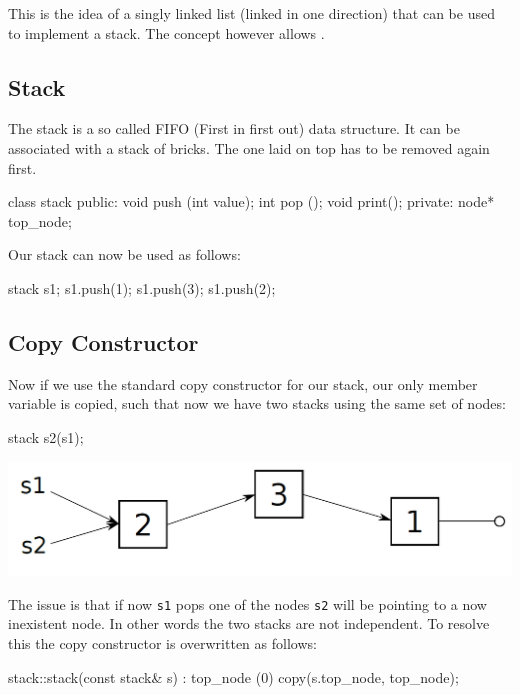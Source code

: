\documentclass[10pt,a4paper]{scrartcl}
\begin{document}
\begin{multicols*}{2}
This is the idea of a singly linked list (linked in one direction) that can be used to implement a stack. The concept however allows .

\subsection{Stack}
\label{sec:Stack}

The stack is a so called FIFO (First in first out) data structure. It can be associated with a stack of bricks. The one laid on top has to be removed again first.

\begin{TPCpp}
class stack {
public:
	void push (int value);
	int pop ();
	void print();
private:
	node* top_node;
}
\end{TPCpp}

Our stack can now be used as follows:

\begin{TPCpp}
stack s1;
s1.push(1);
s1.push(3);
s1.push(2);
\end{TPCpp}

\subsection{Copy Constructor}
\label{sec:CopyContstructorDynamic}

Now if we use the standard copy constructor for our stack, our only member variable is copied, such that now we have two stacks using the same set of nodes:

\begin{TPCpp}
stack s2(s1);
\end{TPCpp}

\includegraphics[width=\linewidth]{Pictures/Stack1}

The issue is that if now \verb+s1+ pops one of the nodes \verb+s2+ will be pointing to a now inexistent node. In other words the two stacks are not independent. To resolve this the copy constructor is overwritten as follows:

\begin{TPCpp}
stack::stack(const stack& s) : top_node (0) {
	copy(s.top_node, top_node);
}


\end{TPCpp}
\end{multicols*}
\end{document}

